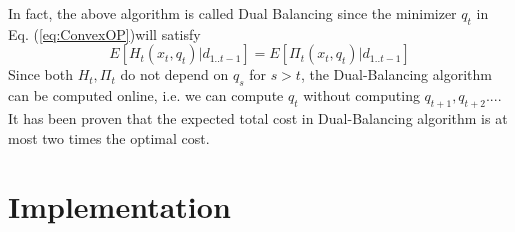 \documentclass[twoside]{article}
\begin{document}
\begin{multicols}{2}
    In fact, the above algorithm is called Dual Balancing since the minimizer $q_t$ in Eq. (\ref{eq:ConvexOP})will satisfy
    \begin{equation}\label{eq:DB}
        E[H_t(x_t,q_t)| d_{1..t-1}] = E[\Pi_t(x_t,q_t)| d_{1..t-1}]
        \end{equation}
      Since both $H_t,\Pi_t$ do not depend on $q_s$ for $s>t$, the Dual-Balancing algorithm can be computed online, i.e. we can compute $q_t$ without computing $q_{t+1}, q_{t+2} ... $. It has been proven that the expected total cost in Dual-Balancing algorithm is at most two times the optimal cost\cite{CLAcha2}.


\section{Implementation}



\end{multicols}
\end{document}
